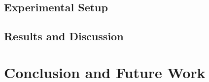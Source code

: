 \documentclass{sig-alternate}
\begin{document}
\subsection{Experimental Setup}
\label{subsec:experimentalSetup}


\subsection{Results and Discussion}
\label{subsec:resultsDiscussion}



\section{Conclusion and Future Work}
\label{sec:conclusion}



%

%
%
\end{document}
